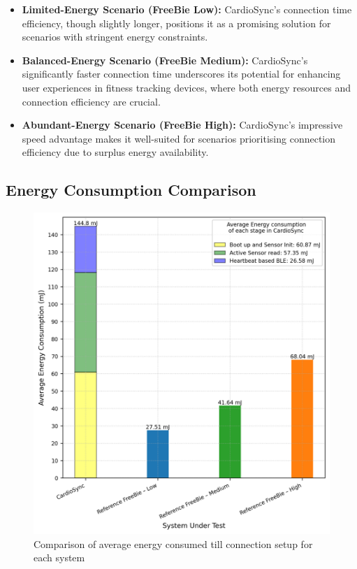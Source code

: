 \begin{itemize}
    \item \textbf{Limited-Energy Scenario (FreeBie Low):} CardioSync's connection time efficiency, though slightly longer, positions it as a promising solution for scenarios with stringent energy constraints.
    
    \item \textbf{Balanced-Energy Scenario (FreeBie Medium):} CardioSync's significantly faster connection time underscores its potential for enhancing user experiences in fitness tracking devices, where both energy resources and connection efficiency are crucial.
    
    \item \textbf{Abundant-Energy Scenario (FreeBie High):} CardioSync's impressive speed advantage makes it well-suited for scenarios prioritising connection efficiency due to surplus energy availability.
\end{itemize}


\subsection{Energy Consumption Comparison}
\begin{figure}[t]
    \centering
    \includegraphics[width=0.7\linewidth]{chapters/Results/Energy_comparison.png}
    \caption{Comparison of average energy consumed till connection setup for each system}
    \label{fig:energy_comp}
\end{figure}

